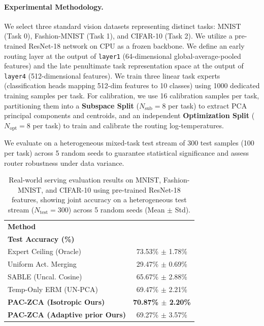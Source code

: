 \paragraph{Experimental Methodology.} We select three standard vision datasets representing distinct tasks: MNIST (Task 0), Fashion-MNIST (Task 1), and CIFAR-10 (Task 2). We utilize a pre-trained ResNet-18 network on CPU as a frozen backbone. We define an early routing layer at the output of \texttt{layer1} (64-dimensional global-average-pooled features) and the late penultimate task representation space at the output of \texttt{layer4} (512-dimensional features). We train three linear task experts (classification heads mapping 512-dim features to 10 classes) using 1000 dedicated training samples per task. For calibration, we use 16 calibration samples per task, partitioning them into a \textbf{Subspace Split} ($N_{\text{sub}} = 8$ per task) to extract PCA principal components and centroids, and an independent \textbf{Optimization Split} ($N_{\text{opt}} = 8$ per task) to train and calibrate the routing log-temperatures. 

We evaluate on a heterogeneous mixed-task test stream of 300 test samples (100 per task) across 5 random seeds to guarantee statistical significance and assess router robustness under data variance.

\begin{table}[htbp]
\caption{Real-world serving evaluation results on MNIST, Fashion-MNIST, and CIFAR-10 using pre-trained ResNet-18 features, showing joint accuracy on a heterogeneous test stream ($N_{\text{test}} = 300$) across 5 random seeds (Mean $\pm$ Std).}
\label{tab:real_world_results}
\centering
\small
\begin{tabular}{lc}
\toprule
\textbf{Method} & \shortstack{\textbf{Heterogeneous}\\\textbf{Test Accuracy (\%)}} \\
\midrule
Expert Ceiling (Oracle) & 73.53\% $\pm$ 1.78\% \\
\midrule
Uniform Act. Merging & 29.47\% $\pm$ 0.69\% \\
SABLE (Uncal. Cosine) & 65.67\% $\pm$ 2.88\% \\
Temp-Only ERM (UN-PCA) & 69.47\% $\pm$ 2.21\% \\
\midrule
\textbf{PAC-ZCA (Isotropic Ours)} & \textbf{70.87\% $\pm$ 2.20\%} \\
\textbf{PAC-ZCA (Adaptive prior Ours)} & 69.27\% $\pm$ 3.57\% \\
\bottomrule
\end{tabular}
\end{table}

